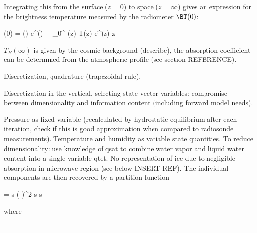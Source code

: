         Integrating this from the surface ($z = 0$) to space ($z = \infty$)
        gives an expression for the brightness temperature measured by the
        radiometer $\BT(0)$:

        \startformula
            \BT(0) = \BT(\infty) e^{\OD(\infty)} + 
                \int_{0}^{\infty} \ABSCOEF(z) T(z) e^{\OD(z)} \diff z \EQSTOP
        \stopformula

        $T_B(\infty)$ is given by the cosmic background (describe), the
        absorption coefficient can be determined from the atmospheric profile
        (see section REFERENCE).

    \stopsubsection

    \startsubsection[title={Numerical Treatment}]

        Discretization, quadrature (trapezoidal rule).

    \stopsubsection

\stopsection


\startsection[title=Representation of the Atmospheric State]

    Discretization in the vertical, selecting state vector variables:
    compromise between dimensionality and information content (including
    forward model needs).

    \startsubsection[title=The Choice of State Vector Variables]

        Pressure as fixed variable (recalculated by hydrostatic equilibrium
        after each iteration, check if this is good approximation when compared
        to radiosonde measurements). Temperature and humidity as variable
        state quantities. To reduce dimensionality: use knowledge of qsat to
        combine water vapor and liquid water content into a single variable
        qtot. No representation of ice due to negligible absorption in
        microwave region (see below INSERT REF). The individual components are
        then recovered by a partition function

        \startformula
            \DERIV{\QLIQ}{\RHL} = \QSAT \startcases
                 \MC s  \NR
                \NC \cos \left(   \right)^2
                     \le s  \EQCOMMA\NR
                  \lt s \NR
            \stopcases
        \stopformula

        where

        \startformula
            \RHL = \frac{\QTOT}{\QSAT} = \frac{\QVAP + \QLIQ}{\QSAT} \EQSTOP
        \stopformula


